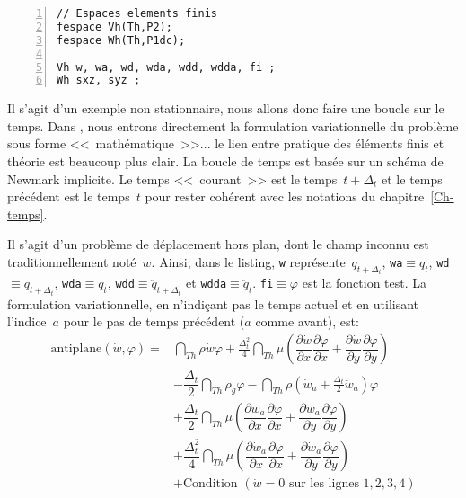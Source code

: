 \color{gris}\scriptsize
\begin{Verbatim}[numbers=left,numbersep=3pt,firstnumber=last]
// Espaces elements finis 
fespace Vh(Th,P2); 
fespace Wh(Th,P1dc);

Vh w, wa, wd, wda, wdd, wdda, fi ; 
Wh sxz, syz ; 
\end{Verbatim}
\color{black}\normalsize

\medskip
Il s'agit d'un exemple non stationnaire, nous allons donc faire une boucle sur le temps. 
Dans \freefem, nous entrons directement la formulation variationnelle du problème sous forme <<~mathématique~>>... 
le lien entre pratique des éléments finis et théorie est beaucoup plus clair. 
La boucle de temps est basée sur un schéma de Newmark implicite. Le temps <<~courant~>>
est le temps~$t+\Delta_t$ et le temps précédent est le temps~$t$ pour rester cohérent avec
les notations du chapitre~\ref{Ch-temps}.

Il s'agit d'un problème de déplacement hors plan, dont le champ inconnu est traditionnellement
noté~$w$. Ainsi, dans le listing, \verb|w| représente~$q_{t+\Delta_t}$, \verb|wa|$\equiv q_t$, 
\verb|wd|$\equiv \dot{q}_{t+\Delta_t}$, \verb|wda|$\equiv \dot{q}_t$, 
\verb|wdd|$\equiv \ddot{q}_{t+\Delta_t}$ et \verb|wdda|$\equiv \ddot{q}_t$. \verb|fi|$\equiv\varphi$
est la fonction test. La formulation variationnelle, en n'indiçant pas le temps actuel et en utilisant l'indice~$a$
pour le pas de temps précédent ($a$ comme avant), est:
\begin{equation}
\begin{array}{rl}
\text{antiplane}(\dot{w},\varphi) = &
	\dint_{Th} \rho \dot{w} \varphi + 
		\frac{\Delta_t^2}4 \dint_{Th} \mu \left( \dfrac{\partial \dot{w}}{\partial x}\dfrac{\partial \varphi}{\partial x} +
		\dfrac{\partial \dot{w}}{\partial y}\dfrac{\partial \varphi}{\partial y}\right)\\[+3ex]
	& - 	\dfrac{\Delta_t}2 \dint_{Th} \rho_g \varphi 
	- \dint_{Th} \rho\left(\dot{w}_a+\frac{\Delta_t}2 \ddot{w}_a\right)\varphi \\[+3ex]
	& + \dfrac{\Delta_t}2 \dint_{Th} \mu \left( \dfrac{\partial w_a}{\partial x}\dfrac{\partial \varphi}{\partial x}
		+ \dfrac{\partial w_a}{\partial y}\dfrac{\partial \varphi}{\partial y} \right) \\[+3ex]
	& + \dfrac{\Delta_t^2}4 \dint_{Th} \mu \left( \dfrac{\partial \dot{w}_a}{\partial x}\dfrac{\partial \varphi}{\partial x} +
		\dfrac{\partial \dot{w}_a}{\partial y}\dfrac{\partial \varphi}{\partial y} \right) \\[+3ex]
	& + \text{Condition } (\dot{w}=0 \text{ sur les lignes } 1,2,3,4)
\end{array}
\end{equation}

